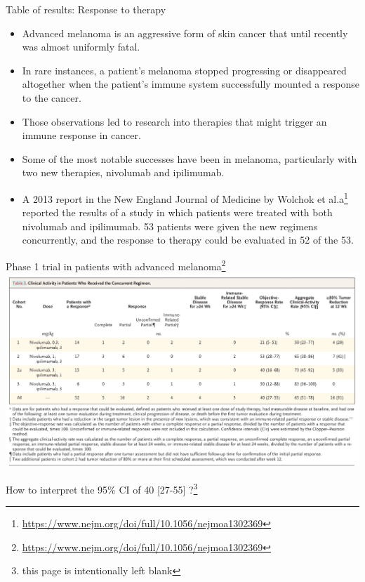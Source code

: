 \documentclass[10pt,handout]{beamer}\usepackage[]{graphicx}\usepackage[]{color}
\begin{document}
\begin{frame}{Table of results: Response to therapy}
\begin{itemize}
	\item Advanced melanoma is an aggressive form of skin cancer that until recently was almost uniformly fatal. 
	\item In rare instances, a patient's melanoma stopped progressing or disappeared altogether when the patient's immune system successfully mounted a response to the cancer. 
	\item Those observations led to research into therapies that might trigger an immune response in cancer. 
	\item Some of the	most notable successes have been in melanoma, particularly with two new therapies, nivolumab
	and ipilimumab. \pause 
	\item A 2013 report in the New England Journal of Medicine by Wolchok et al.a\footnote{\tiny \url{https://www.nejm.org/doi/full/10.1056/nejmoa1302369}} reported the results
	of a study in which patients were treated with both nivolumab and ipilimumab. 53 patients were given the new regimens concurrently, and the response to therapy could be evaluated in 52 of the 53.
\end{itemize}
\end{frame}

\begin{frame}{Phase 1 trial in patients with advanced melanoma\footnote{\tiny \url{https://www.nejm.org/doi/full/10.1056/nejmoa1302369}}}
	\centering
	\includegraphics[scale=0.25]{wolchok2.png}
\end{frame}

\begin{frame}{How to interpret the 95\% CI of 40 [27-55] ?\footnote{\tiny this page is intentionally left blank}}
	
\end{frame}
\end{document}
